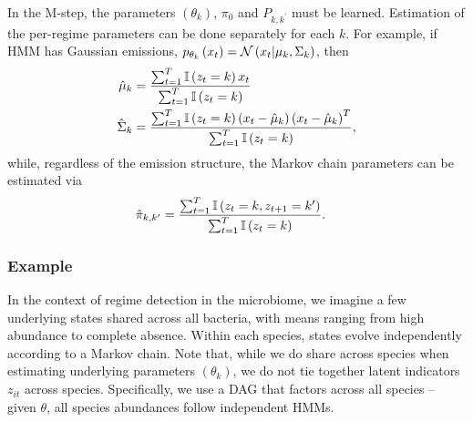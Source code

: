 In the M-step, the parameters $\left(\theta_{k}\right)$, $\pi_0$ and
$P_{k, k^{\prime}}$ must be learned. Estimation of the per-regime parameters
can be done separately for each $k$. For example, if HMM has Gaussian emissions,
$p_{\theta_{k}}\left(x_{t}\right) = \mathcal{N}\left(x_{t} \vert \mu_{k},
\Sigma_{k}\right)$, then
\begin{align*}
  \hat{\mu}_{k} &= \frac{\sum_{t = 1}^{T} \mathbb{I}\left({z_{t} = k}\right)x_{t}}{\sum_{t = 1}^{T}\mathbb{I}\left({z_{t} = k}\right)} \\
  \hat{\Sigma}_{k} &= \frac{\sum_{t = 1}^{T} \mathbb{I}\left({z_{t} = k}\right)\left(x_{t} - \hat{\mu}_{k}\right)\left(x_{t} - \hat{\mu}_{k}\right)^{T}}
      {\sum_{t = 1}^{T} \mathbb{I}\left({z_{t} = k}\right)},
\end{align*}
while, regardless of the emission structure, the Markov chain parameters can be
estimated via
\begin{align*}
  \hat{\pi}_{k, k^{\prime}} &= \frac{\sum_{t = 1}^{T} \mathbb{I}\left({z_{t} = k, z_{t + 1} = k^{\prime}}\right)}{\sum_{t = 1}^{T} \mathbb{I}\left({z_{t} = k}\right)}.
\end{align*}

\subsubsection{Example}
\label{subsubsec:hmm_example}

In the context of regime detection in the microbiome, we imagine a few
underlying states shared across all bacteria, with means ranging from high abundance to
complete absence. Within each species, states evolve independently according to
a Markov chain. Note that, while we do share across species when estimating
underlying parameters $\left(\theta_{k}\right)$, we do not tie together latent
indicators $z_{it}$ across species. Specifically, we use a DAG that factors
across all species -- given $\theta$, all species abundances follow independent
HMMs.

